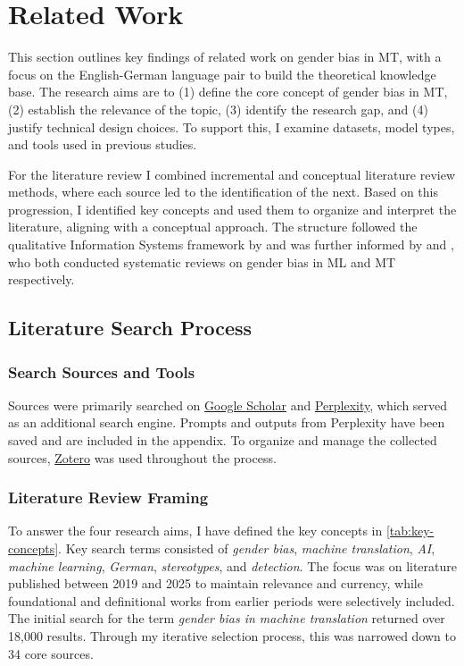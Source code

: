 \chapter{Related Work}

This section outlines key findings of related work on gender bias in MT, with a focus on the English-German language pair to build the theoretical knowledge base. The research aims are to (1) define the core concept of gender bias in MT, (2) establish the relevance of the topic, (3) identify the research gap, and (4) justify technical design choices. To support this, I examine datasets, model types, and tools used in previous studies.

For the literature review I combined incremental and conceptual literature review methods, where each source led to the identification of the next. Based on this progression, I identified key concepts and used them to organize and interpret the literature, aligning with a conceptual approach. The structure followed the qualitative Information Systems framework by \citet{schryenWritingQualitativeLiterature2015} and was further informed by \citet{shresthaExploringGenderBiases2022} and \citet{savoldiDecadeGenderBias2025}, who both conducted systematic reviews on gender bias in ML and MT respectively. 

\section{Literature Search Process}

\subsection{Search Sources and Tools}
Sources were primarily searched on \href{https://scholar.google.com/}{Google Scholar} and \href{https://www.perplexity.ai/}{Perplexity}, which served as an additional search engine. Prompts and outputs from Perplexity have been saved and are included in the appendix. To organize and manage the collected sources, \href{https://www.zotero.org/}{Zotero} was used throughout the process.

\subsection{Literature Review Framing}

To answer the four research aims, I have defined the key concepts in \autoref{tab:key-concepts}. Key search terms consisted of \textit{gender bias}, \textit{machine translation}, \textit{AI}, \textit{machine learning}, \textit{German}, \textit{stereotypes}, and \textit{detection}. The focus was on literature published between 2019 and 2025 to maintain relevance and currency, while foundational and definitional works from earlier periods were selectively included. The initial search for the term \textit{gender bias in machine translation} returned over 18,000 results. Through my iterative selection process, this was narrowed down to 34 core sources.

